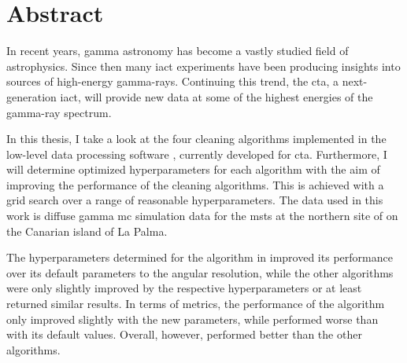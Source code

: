 \thispagestyle{plain}

\section*{Abstract}
In recent years, gamma astronomy has become a vastly studied field of astrophysics.
Since then many \gls{iact} experiments have been producing insights into sources of
high-energy gamma-rays. Continuing this trend, the \gls{cta}, a next-generation \gls{iact},
will provide new data at some of the highest energies of the gamma-ray spectrum.

In this thesis, I take a look at the four cleaning algorithms implemented in the low-level data processing software \ctapipe{},
currently developed for \gls{cta}. Furthermore, I will determine optimized hyperparameters for each algorithm
with the aim of improving the performance of the cleaning algorithms. This is achieved with a grid search
over a range of reasonable hyperparameters. The data used in this work is diffuse gamma \gls{mc} simulation data for
the \glspl{mst} at the northern site of \cta{} on the Canarian island of La Palma.

The hyperparameters determined for the \tcc{} algorithm in \ctapipe{} improved its performance over
its default parameters \wrt to the angular resolution, while the other algorithms were only
slightly improved by the respective hyperparameters or at least returned similar results.
In terms of metrics, the performance of the \tcc{} algorithm only improved slightly with the new parameters, while \fact{}
performed worse than with its default values. Overall, however, \fact{} performed better than the other
algorithms.


